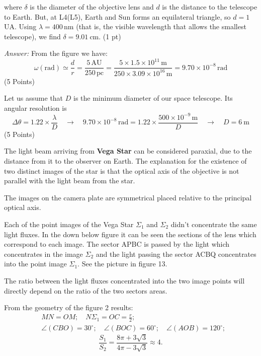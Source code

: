 where $\delta$ is the diameter of the objective lens and $d$ is the distance
to the telescope to Earth. But, at L4(L5), Earth and Sun forms an equilateral
triangle, so $d = 1$\,UA. Using $\lambda = 400$\,nm (that is, the visible
wavelength that allows the smallest telescope), we find
$\delta = 9.01\ \mathrm{cm}$.
\hfill(1 pt)

\textit{Answer:} From the figure we have:
\[
\omega(\mathrm{rad}) \simeq \frac{d}{r} = \frac{5\,\mathrm{AU}}{250\,\mathrm{pc}}
 = \frac{5 \times 1.5 \times 10^{11}\,\mathrm{m}}
        {250 \times 3.09 \times 10^{16}\,\mathrm{m}}
 = 9.70 \times 10^{-8}\,\mathrm{rad}
\]
\hfill(5 Points)

Let us assume that $D$ is the minimum diameter of our space telescope.
Its angular resolution is
\[
\Delta\theta = 1.22 \times \frac{\lambda}{D}
\quad\rightarrow\quad
9.70 \times 10^{-8}\,\mathrm{rad}
 = 1.22 \times \frac{500 \times 10^{-9}\,\mathrm{m}}{D}
\quad\rightarrow\quad
D = 6\ \mathrm{m}
\]
\hfill(5 Points)

The light beam arriving from \textbf{Vega Star} can be considered paraxial,
due to the distance from it to the observer on Earth. The explanation for the
existence of two distinct images of the star is that the optical axis of the
objective is not parallel with the light beam from the star.

The images on the camera plate are symmetrical placed relative to the
principal optical axis.


Each of the point images of the Vega Star $\Sigma_1$ and $\Sigma_2$ didn't
concentrate the same light fluxes. In the down below figure it can be seen
the sections of the lens which correspond to each image. The sector APBC is
passed by the light which concentrates in the image $\Sigma_2$ and the light
passing the sector ACBQ concentrates into the point image $\Sigma_1$. See the
picture in figure 13.


The ratio between the light fluxes concentrated into the two image points
will directly depend on the ratio of the two sectors areas.

From the geometry of the figure 2 results:
\begin{align*}
&MN = OM;\quad N\Sigma_1 = OC = \frac{r}{2};\\
&\angle(CBO) = 30^\circ;\quad \angle(BOC) = 60^\circ;\quad
 \angle(AOB) = 120^\circ;
\end{align*}
\[
\frac{S_1}{S_2} = \frac{8\pi + 3\sqrt{3}}{4\pi - 3\sqrt{3}} \approx 4.
\]

